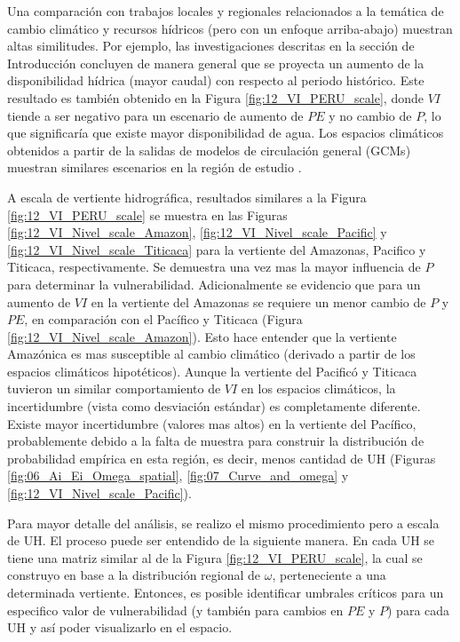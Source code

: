 \documentclass[12pt]{article}
\begin{document}
Una comparación con trabajos locales y regionales relacionados a la temática de cambio climático y recursos hídricos (pero con un enfoque arriba-abajo) muestran altas similitudes. Por ejemplo, las investigaciones descritas en la sección de Introducción \citep{Pouyaud2005,Juen2007,LavadoCasimiro2011,Andres2014,VanSoesbergen2016,Olsson2017,Pilares2018} concluyen de manera general que se proyecta un aumento de la disponibilidad hídrica (mayor caudal) con respecto al periodo histórico. Este resultado es también obtenido en la Figura \ref{fig:12_VI_PERU_scale}, donde $VI$ tiende a ser negativo para un escenario de aumento de $PE$ y no cambio de $P$, lo que significaría que existe mayor disponibilidad de agua. Los espacios climáticos obtenidos a partir de la salidas de modelos de circulación general (GCMs) muestran similares escenarios en la región de estudio \citep{stocker2013climate}. 



A escala de vertiente hidrográfica, resultados similares a la Figura \ref{fig:12_VI_PERU_scale} se muestra en las Figuras \ref{fig:12_VI_Nivel_scale_Amazon}, \ref{fig:12_VI_Nivel_scale_Pacific} y \ref{fig:12_VI_Nivel_scale_Titicaca} para la vertiente del Amazonas, Pacifico y Titicaca, respectivamente. Se demuestra una vez mas la mayor influencia de $P$ para determinar la vulnerabilidad. Adicionalmente se evidencio que para un aumento de $VI$ en la vertiente del Amazonas se requiere un menor cambio de $P$ y $PE$, en comparación con el Pacífico y Titicaca (Figura \ref{fig:12_VI_Nivel_scale_Amazon}). Esto hace entender que la vertiente Amazónica es mas susceptible al cambio climático (derivado a partir de los espacios climáticos hipotéticos). Aunque la vertiente del Pacificó y Titicaca tuvieron un similar comportamiento de $VI$ en los espacios climáticos, la incertidumbre (vista como desviación estándar) es completamente diferente. Existe mayor incertidumbre (valores mas altos) en la vertiente del Pacífico, probablemente debido a la falta de muestra para construir la distribución de probabilidad empírica en esta región, es decir, menos cantidad de UH (Figuras \ref{fig:06_Ai_Ei_Omega_spatial}, \ref{fig:07_Curve_and_omega} y \ref{fig:12_VI_Nivel_scale_Pacific}). 


\vspace*{.5cm}


Para mayor detalle del análisis, se realizo el mismo procedimiento pero a escala de UH. El proceso puede ser entendido de la siguiente manera. En cada UH se tiene una matriz similar al de la Figura \ref{fig:12_VI_PERU_scale}, la cual se construyo en base a la distribución regional de $\omega$, perteneciente a una determinada vertiente. Entonces, es posible identificar umbrales críticos para un especifico valor de vulnerabilidad (y también para cambios en $PE$ y $P$) para cada UH y así poder visualizarlo en el espacio. 
\end{document}
